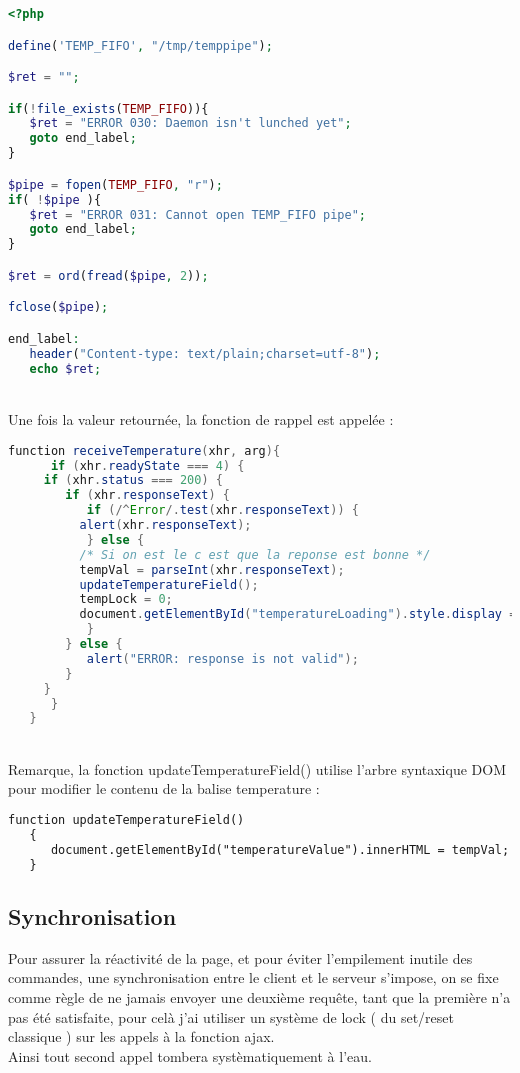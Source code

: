 \begin{DDbox}{\linewidth}
\begin{lstlisting}[language=php]
<?php

define('TEMP_FIFO', "/tmp/temppipe");

$ret = "";

if(!file_exists(TEMP_FIFO)){
   $ret = "ERROR 030: Daemon isn't lunched yet";
   goto end_label;
}

$pipe = fopen(TEMP_FIFO, "r");
if( !$pipe ){
   $ret = "ERROR 031: Cannot open TEMP_FIFO pipe";
   goto end_label;
}

$ret = ord(fread($pipe, 2));

fclose($pipe);

end_label:
   header("Content-type: text/plain;charset=utf-8");
   echo $ret;
\end{lstlisting}
\end{DDbox}
\\
Une fois la valeur retournée, la fonction de rappel est appelée :\\
\begin{DDbox}{\linewidth}
\begin{lstlisting}[language=java]
  function receiveTemperature(xhr, arg){
      if (xhr.readyState === 4) {
	 if (xhr.status === 200) {
	    if (xhr.responseText) {
	       if (/^Error/.test(xhr.responseText)) {
		  alert(xhr.responseText);
	       } else {
		  /* Si on est le c est que la reponse est bonne */
		  tempVal = parseInt(xhr.responseText);
		  updateTemperatureField();
		  tempLock = 0;
		  document.getElementById("temperatureLoading").style.display = "none";
	       }
	    } else {
	       alert("ERROR: response is not valid");
	    }
	 }
      }
   }  
\end{lstlisting}
\end{DDbox}
\\
Remarque, la fonction updateTemperatureField() utilise l'arbre syntaxique DOM pour modifier le contenu de la balise temperature :\\
\begin{DDbox}{\linewidth}
\begin{lstlisting}[language=html]
  function updateTemperatureField()
   {
      document.getElementById("temperatureValue").innerHTML = tempVal;
   }
\end{lstlisting}
\end{DDbox}

\subsection{Synchronisation}

Pour assurer la réactivité de la page, et pour éviter l'empilement inutile des commandes, une synchronisation entre le client et le serveur s'impose, on se fixe comme règle de ne jamais envoyer une deuxième requête, tant que la première n'a pas été satisfaite, pour celà j'ai utiliser un système de lock ( du set/reset classique ) sur les appels à la fonction ajax.\\
Ainsi tout second appel tombera systèmatiquement à l'eau.\\

